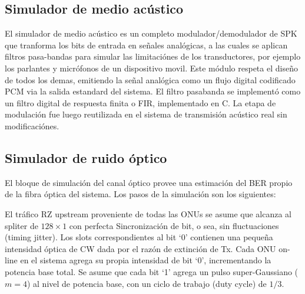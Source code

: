 \subsection{Simulador de medio acústico}
El simulador de medio acústico es un completo modulador/demodulador de SPK que tranforma los bits de entrada en señales analógicas, a las cuales se aplican filtros pasa-bandas para simular las limitaciónes de los transductores, por ejemplo los parlantes y micrófonos de un dispositivo movil. Este módulo respeta el diseño de todos los demas, emitiendo la señal analógica como un flujo digital codificado PCM via la salida estandard del sistema. El filtro pasabanda se implementó como un filtro digital de respuesta finita o FIR, implementado en C.
La etapa de modulación fue luego reutilizada en el sistema de transmisión acústico real sin modificaciónes.

\subsection{Simulador de ruido óptico}

El bloque de simulación del canal óptico provee una estimación del BER propio de la fibra óptica del sistema. Los pasos de la simulación son los siguientes:

El tráfico RZ upstream proveniente de todas las ONUs se asume que alcanza al spliter de $128\times1$ con perfecta Sincronización de bit, o sea, sin fluctuaciones (timing jitter).
Los slots correspondientes al bit `0' contienen una pequeña intensidad óptica de CW dada por el razón de extinción de Tx.
Cada ONU on-line en el sistema agrega su propia intensidad de bit `0', incrementando la potencia base total.
Se asume que cada bit `1' agrega un pulso super-Gaussiano ($m=4$) al nivel de potencia base, con un ciclo de trabajo (duty cycle) de $1/3$.


